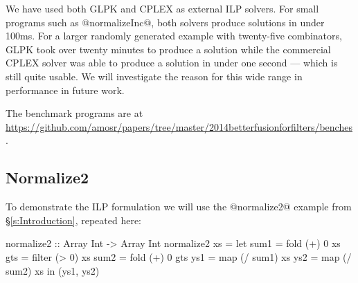We have used both GLPK and CPLEX as external ILP solvers. For small programs such as @normalizeInc@, both solvers produce solutions in under 100ms. For a larger randomly generated example with twenty-five combinators, GLPK took over twenty minutes to produce a solution while the commercial CPLEX solver was able to produce a solution in under one second --- which is still quite usable. We will investigate the reason for this wide range in performance in future work.


The benchmark programs are at \url{https://github.com/amosr/papers/tree/master/2014betterfusionforfilters/benches}.



\pagebreak
\subsection{Normalize2}
To demonstrate the ILP formulation we will use the @normalize2@ example from \S\ref{s:Introduction}, repeated here:
\begin{code}
  normalize2 :: Array Int -> Array Int
  normalize2 xs
   = let sum1 = fold   (+)  0   xs
         gts  = filter (>   0)  xs
         sum2 = fold   (+)  0   gts
         ys1  = map    (/ sum1) xs
         ys2  = map    (/ sum2) xs
     in (ys1, ys2)
\end{code}

